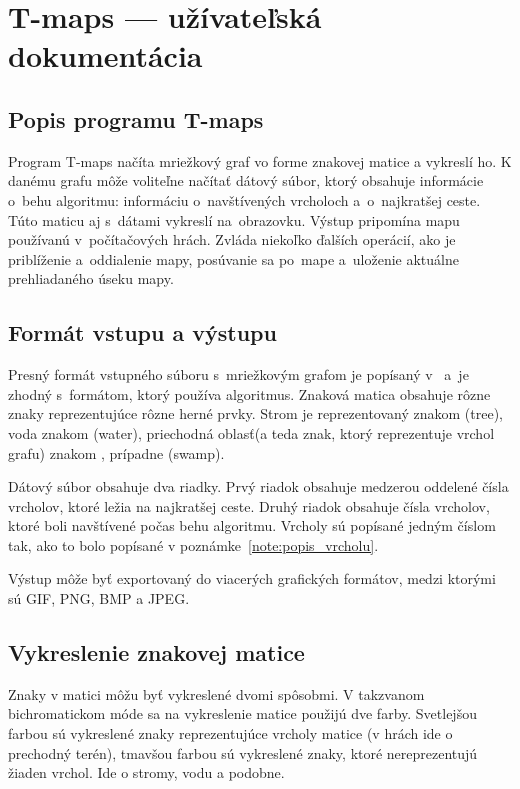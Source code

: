 \chapter{T-maps --- užívateľská dokumentácia}
\label{userdoc}
\section{Popis programu T-maps}
Program T-maps načíta mriežkový graf vo forme znakovej matice a vykreslí ho. K danému grafu môže voliteľne načítať dátový súbor, ktorý obsahuje
informácie o~behu algoritmu: informáciu o~navštívených vrcholoch a~o~najkratšej ceste.
Túto maticu aj s~dátami vykreslí na~obrazovku. Výstup pripomína mapu používanú v~počítačových hrách.
Zvláda niekoľko ďalších operácií, ako je priblíženie a~oddialenie mapy, posúvanie sa po~mape a~uloženie aktuálne prehliadaného úseku mapy.


\section{Formát vstupu a výstupu}
Presný formát vstupného súboru s~mriežkovým grafom je popísaný v~\cite{sturtevant2012benchmarks} a~je zhodný s~formátom, 
ktorý používa algoritmus. Znaková matica obsahuje rôzne znaky reprezentujúce rôzne herné prvky.
Strom je reprezentovaný znakom (tree), voda znakom (water), priechodná oblasť(a teda znak, ktorý reprezentuje
vrchol grafu) znakom , prípadne  (swamp).

Dátový súbor obsahuje dva riadky. Prvý riadok obsahuje medzerou oddelené čísla vrcholov, ktoré ležia na najkratšej ceste.
Druhý riadok obsahuje čísla vrcholov, ktoré boli navštívené počas behu algoritmu. 
Vrcholy sú popísané jedným číslom tak, ako to bolo popísané v poznámke~\ref{note:popis_vrcholu}.

Výstup môže byť exportovaný do viacerých grafických formátov, medzi ktorými sú GIF, PNG, BMP a JPEG.



\section{Vykreslenie znakovej matice}

Znaky v matici môžu byť vykreslené dvomi spôsobmi. V takzvanom bichromatickom móde sa na vykreslenie matice použijú dve farby.
Svetlejšou farbou sú vykreslené znaky reprezentujúce vrcholy matice (v hrách ide o prechodný terén), tmavšou farbou sú vykreslené znaky, ktoré
nereprezentujú žiaden vrchol. Ide o stromy, vodu a podobne.

